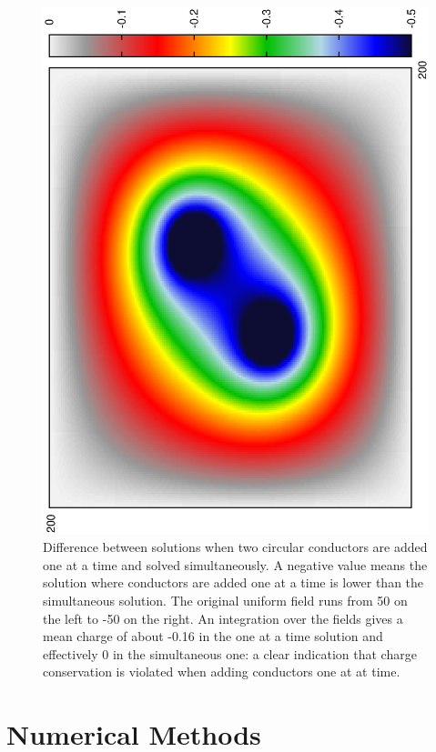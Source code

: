 \documentclass[aps,twocolumn,pre,nofootinbib,10pt]{revtex4-1}
\begin{document}
\begin{figure}
\includegraphics*[height=\breite \columnwidth,angle=270]{difference.ps} 
\caption{Difference between solutions when two circular conductors are added one at a time and solved simultaneously. A negative value means the solution where conductors are added one at a time is lower than the simultaneous solution. The original uniform field runs from 50 on the left to -50 on the right. An integration over the fields gives a mean charge of about -0.16 in the one at a time solution and effectively 0 in the simultaneous one: a clear indication that charge conservation is violated when adding conductors one at at time.}
\label{fig:difference}
\end{figure}

\section{Numerical Methods \label{sec:met}}
\end{document}
